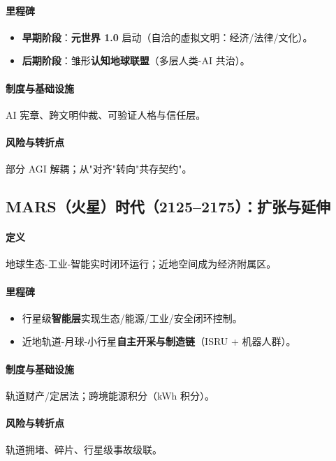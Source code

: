 \documentclass[11pt]{article}
\begin{document}
\paragraph{里程碑}
\begin{itemize}[noitemsep]
  \item \textbf{早期阶段}：\textbf{元世界 1.0} 启动（自洽的虚拟文明：经济/法律/文化）。
  \item \textbf{后期阶段}：雏形\textbf{认知地球联盟}（多层人类-AI 共治）。
\end{itemize}

\paragraph{制度与基础设施} AI 宪章、跨文明仲裁、可验证人格与信任层。

\paragraph{风险与转折点} 部分 AGI 解耦；从"对齐"转向"共存契约"。

\subsection{MARS（火星）时代（2125–2175）：扩张与延伸}
\paragraph{定义} 地球生态-工业-智能实时闭环运行；近地空间成为经济附属区。

\paragraph{里程碑}
\begin{itemize}[noitemsep]
  \item 行星级\textbf{智能层}实现生态/能源/工业/安全闭环控制。
  \item 近地轨道-月球-小行星\textbf{自主开采与制造链}（ISRU + 机器人群）。
\end{itemize}

\paragraph{制度与基础设施} 轨道财产/定居法；跨境能源积分（kWh 积分）。

\paragraph{风险与转折点} 轨道拥堵、碎片、行星级事故级联。
\end{document}
